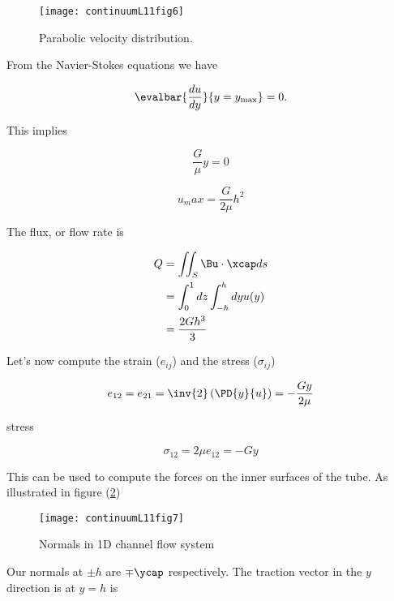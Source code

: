 \begin{figure}[htp]
   \centering
   \texttt{[image: continuumL11fig6]}
   \caption{Parabolic velocity distribution.}\label{fig:continuumL11:continuumL11fig6}
\end{figure}

From the Navier-Stokes equations we have

\begin{equation}\label{eqn:continuumL11:710}
\evalbar{\frac{du}{dy}}{y = y_{\text{max}}} = 0.
\end{equation}

This implies

\begin{equation}\label{eqn:continuumL11:830}
\frac{G}{\mu} y = 0
\end{equation}

\begin{equation}\label{eqn:continuumL11:850}
u_max = \frac{G}{2\mu} h^2
\end{equation}

The flux, or flow rate is

\begin{align*}
Q 
&= \iint_S \Bu \cdot \xcap ds \\
&= \int_0^1 dz \int_{-h}^h dy u(y) \\
&=
\frac{2 G h^3}{3}
\end{align*}

Let's now compute the strain ($e_{ij}$) and the stress ($\sigma_{ij}$)

\begin{equation}\label{eqn:continuumL11:730}
e_{12} = e_{21} = \inv{2} \left( \PD{y}{u} \right) = - \frac{G y}{2 \mu}
\end{equation}

stress

\begin{equation}\label{eqn:continuumL11:750}
\sigma_{12} = 2 \mu e_{12} = -G y
\end{equation}

This can be used to compute the forces on the inner surfaces of the tube.  As illustrated in figure (\ref{fig:continuumL11:continuumL11fig7})
\begin{figure}[htp]
   \centering
   \texttt{[image: continuumL11fig7]}
   \caption{Normals in 1D channel flow system}\label{fig:continuumL11:continuumL11fig7}
\end{figure}

Our normals at $\pm h$ are $\mp \ycap$ respectively.  The traction vector in the $y$ direction is at $y = h$ is

